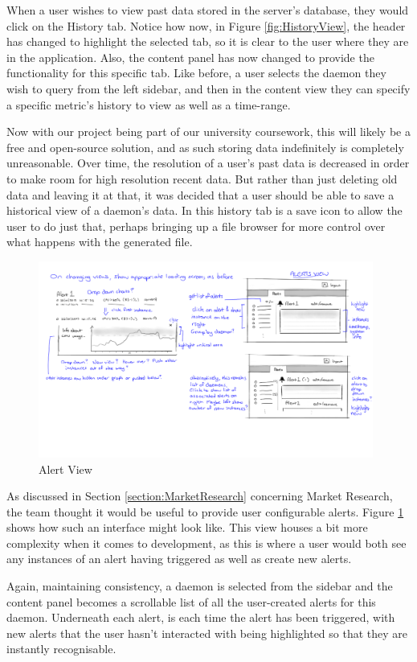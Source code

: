 \documentclass{l3proj}
\begin{document}
When a user wishes to view past data stored in the server's database, they would click on the History tab. Notice how now, in Figure \ref{fig:HistoryView}, the header has changed to highlight the selected tab, so it is clear to the user where they are in the application. Also, the content panel has now changed to provide the functionality for this specific tab. Like before, a user selects the daemon they wish to query from the left sidebar, and then in the content view they can specify a specific metric's history to view as well as a time-range.

Now with our project being part of our university coursework, this will likely be a free and open-source solution, and as such storing data indefinitely is completely unreasonable. Over time, the resolution of a user's past data is decreased in order to make room for high resolution recent data. But rather than just deleting old data and leaving it at that, it was decided that a user should be able to save a historical view of a daemon's data. In this history tab is a save icon to allow the user to do just that, perhaps bringing up a file browser for more control over what happens with the generated file.

\begin{figure}[H]
\centering
\includegraphics[width=110mm]{Concept_Designs/AlertView.png}
\caption{Alert View}
\label{fig:AlertView}
\end{figure}

As discussed in Section \ref{section:MarketResearch} concerning Market Research, the team thought it would be useful to provide user configurable alerts. Figure \ref{fig:AlertView} shows how such an interface might look like. This view houses a bit more complexity when it comes to development, as this is where a user would both see any instances of an alert having triggered as well as create new alerts.

Again, maintaining consistency, a daemon is selected from the sidebar and the content panel becomes a scrollable list of all the user-created alerts for this daemon. Underneath each alert, is each time the alert has been triggered, with new alerts that the user hasn't interacted with being highlighted so that they are instantly recognisable.
\end{document}
